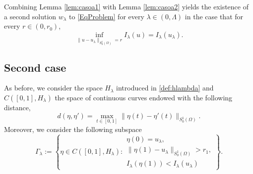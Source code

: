 \documentclass[11pt]{amsart}
\numberwithin{equation}{section} %
\theoremstyle{definition}
\begin{document}
 
Combining Lemma \ref{lem:casoa1} with Lemma \ref{lem:casoa2} yields the existence of a second 
solution $w_\lambda$ to \eqref{EqProblem} for every $\lambda \in (0,\Lambda)$ in the case that
for every $r\in (0,r_0)$,
\[
\inf_{\|u-u_\lambda\|_{S_{0}^{1}(\Omega)}=r}I_\lambda(u)=I_\lambda(u_\lambda).
\]
 

\subsection{Second case} \label{subsec:CaseII}


%


As before, we consider the space $H_\lambda$ introduced in \eqref{def:hlambda} and
$C([0,1],H_\lambda)$ the space of continuous curves endowed with the following distance,
\begin{equation}\label{maxdistance}
d(\eta,\eta')=\max_{t\in[0,1]}\|\eta(t)-\eta'(t)\|_{S^1_0(\Omega)}.
\end{equation}
Moreover, we consider the following subspace
\begin{equation}\label{def:gammal}
\Gamma_\lambda:=\left\{\eta\in C([0,1],H_\lambda):\begin{array}{l}
	 \eta(0)=u_\lambda,\\[0.1cm] 
	\|\eta(1)-u_\lambda\|_{S^{1}_{0}(\Omega)}>r_1,\\[0.1cm]
	I_\lambda(\eta(1))<I_\lambda(u_\lambda)
\end{array}
\right\}.
\end{equation}
\end{document}
